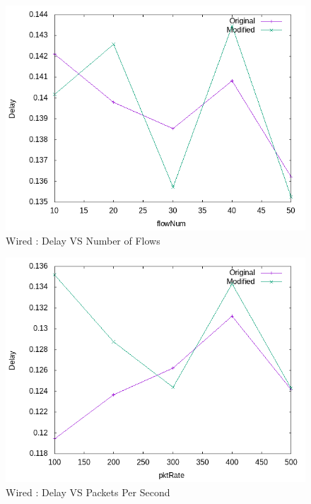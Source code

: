      \begin{figure}[!h]
        \centering
        \includegraphics[width=.9\textwidth]{Pictures/Wired/Combined/DelayVSflowNum.png}
        \caption{Wired : Delay VS Number of Flows}
    \end{figure}
    
    \begin{figure}[!h]
        \centering
        \includegraphics[width=.9\textwidth]{Pictures/Wired/Combined/DelayVSpktRate.png}
        \caption{Wired : Delay VS Packets Per Second}
    \end{figure}
    
\newpage
